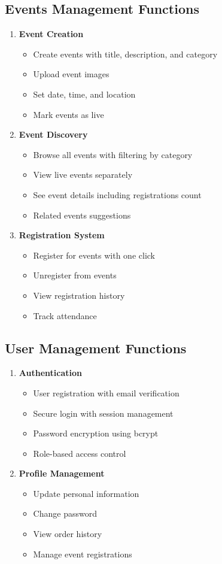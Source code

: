 \documentclass{scrreprt}
\begin{document}
\subsection{Events Management Functions}
\begin{enumerate}
\item \textbf{Event Creation}
\begin{itemize}
\item Create events with title, description, and category
\item Upload event images
\item Set date, time, and location
\item Mark events as live
\end{itemize}

\item \textbf{Event Discovery}
\begin{itemize}
\item Browse all events with filtering by category
\item View live events separately
\item See event details including registrations count
\item Related events suggestions
\end{itemize}

\item \textbf{Registration System}
\begin{itemize}
\item Register for events with one click
\item Unregister from events
\item View registration history
\item Track attendance
\end{itemize}
\end{enumerate}

\subsection{User Management Functions}
\begin{enumerate}
\item \textbf{Authentication}
\begin{itemize}
\item User registration with email verification
\item Secure login with session management
\item Password encryption using bcrypt
\item Role-based access control
\end{itemize}

\item \textbf{Profile Management}
\begin{itemize}
\item Update personal information
\item Change password
\item View order history
\item Manage event registrations
\end{itemize}
\end{enumerate}
\end{document}
